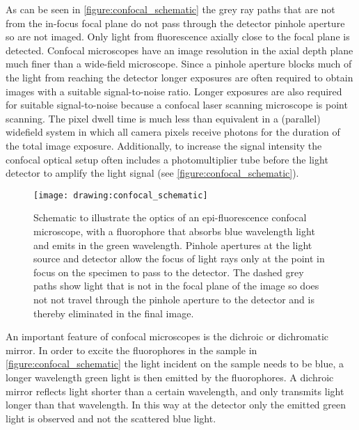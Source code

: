 As can be seen in \autoref{figure:confocal_schematic} the grey ray paths that are not from the in-focus focal plane do not pass through the detector pinhole aperture so are not imaged. Only light from fluorescence axially close to the focal plane is detected. Confocal microscopes have an image resolution in the axial depth plane much finer than a wide-field microscope. Since a pinhole aperture blocks much of the light from reaching the detector longer exposures are often required to obtain images with a suitable signal-to-noise ratio. Longer exposures are also required for suitable signal-to-noise because a confocal laser scanning microscope is point scanning. The pixel dwell time is much less than equivalent in a (parallel) widefield system in which all camera pixels receive photons for the duration of the total image exposure. Additionally, to increase the signal intensity the confocal optical setup often includes a photomultiplier tube before the light detector to amplify the light signal (see \autoref{figure:confocal_schematic}).

\begin{figure}[htbp!]
	\centering
	\texttt{[image: drawing:confocal\_schematic]}
	\caption[Schematic of confocal microscopy optics]{Schematic to illustrate the optics of an epi-fluorescence confocal microscope, with a fluorophore that absorbs blue wavelength light and emits in the green wavelength. Pinhole apertures at the light source and detector allow the focus of light rays only at the point in focus on the specimen to pass to the detector. The dashed grey paths show light that is not in the focal plane of the image so does not not travel through the pinhole aperture to the detector and is thereby eliminated in the final image.}
	\label{figure:confocal_schematic}
\end{figure}

An important feature of confocal microscopes is the dichroic or dichromatic mirror. In order to excite the fluorophores in the sample in \autoref{figure:confocal_schematic} the light incident on the sample needs to be blue, a longer wavelength green light is then emitted by the fluorophores. A dichroic mirror reflects light shorter than a certain wavelength, and only transmits light longer than that wavelength. In this way at the detector only the emitted green light is observed and not the scattered blue light.

